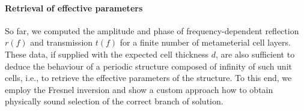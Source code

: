 \paragraph{Retrieval of effective parameters} 
So far, we computed the amplitude and phase of frequency-dependent reflection $r(f)$ and transmission $t(f)$ for a finite number of metameterial cell layers. 
These data, if supplied with the expected cell thickness $d$, are also sufficient to deduce the behaviour of a periodic structure composed of infinity of such unit cells, i.e., to retrieve the effective parameters of the structure. %
To this end, we employ the Fresnel inversion and show a custom approach how to obtain physically sound selection of the correct branch of solution.

